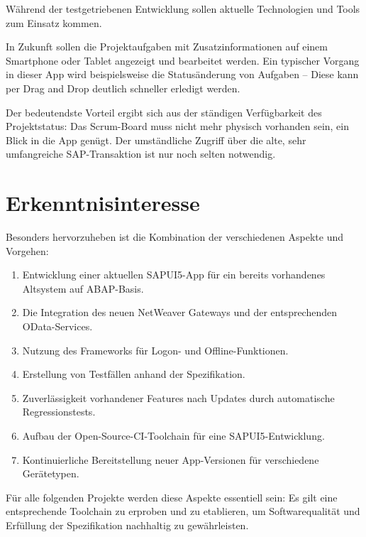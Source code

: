 Während der testgetriebenen Entwicklung sollen aktuelle Technologien und Tools zum Einsatz
kommen.

In Zukunft sollen die Projektaufgaben mit Zusatzinformationen auf einem Smartphone oder
Tablet angezeigt und bearbeitet werden. Ein typischer Vorgang in dieser App wird
beispielsweise die Statusänderung von Aufgaben -- Diese kann per Drag and
Drop deutlich schneller erledigt werden.

Der bedeutendste Vorteil ergibt sich aus der ständigen Verfügbarkeit des
Projektstatus:
Das Scrum-Board muss nicht mehr physisch vorhanden sein, ein Blick in die App
genügt.
Der umständliche Zugriff über die alte, sehr umfangreiche SAP-Transaktion ist nur noch selten notwendig.


\section{Erkenntnisinteresse}
Besonders hervorzuheben ist die Kombination der verschiedenen Aspekte und
Vorgehen:

\begin{enumerate}
	\item Entwicklung einer aktuellen SAPUI5-App für ein bereits vorhandenes
	Altsystem auf ABAP-Basis.
	\item Die Integration des neuen NetWeaver Gateways und der entsprechenden
	OData-Services.
	\item Nutzung des Frameworks für Logon- und	Offline-Funktionen.
	\item Erstellung von Testfällen anhand der Spezifikation.
	\item Zuverlässigkeit vorhandener Features nach Updates durch automatische
	Regressionstests.
	\item Aufbau der Open-Source-CI-Toolchain für eine SAPUI5-Entwicklung.
	\item Kontinuierliche Bereitstellung neuer App-Versionen für
	verschiedene Gerätetypen.
\end{enumerate}
Für alle folgenden Projekte werden diese Aspekte essentiell sein: Es gilt eine
entsprechende Toolchain zu erproben und zu etablieren, um
Softwarequalität und Erfüllung der Spezifikation nachhaltig zu gewährleisten.